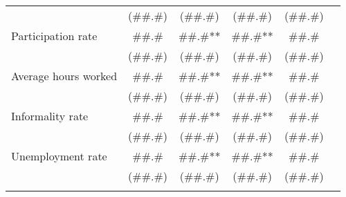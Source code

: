 \begin{tabular}{rccccc}
      & (\#\#.\#) & (\#\#.\#) & (\#\#.\#) & (\#\#.\#) &  \\
\multicolumn{1}{l}{Participation rate} & \#\#.\# & \#\#.\#** & \#\#.\#** & \#\#.\# &  \\
      & (\#\#.\#) & (\#\#.\#) & (\#\#.\#) & (\#\#.\#) &  \\
\multicolumn{1}{l}{Average hours worked} & \#\#.\# & \#\#.\#** & \#\#.\#** & \#\#.\# &  \\
      & (\#\#.\#) & (\#\#.\#) & (\#\#.\#) & (\#\#.\#) &  \\
\multicolumn{1}{l}{Informality rate} & \#\#.\# & \#\#.\#** & \#\#.\#** & \#\#.\# &  \\
      & (\#\#.\#) & (\#\#.\#) & (\#\#.\#) & (\#\#.\#) &  \\
\multicolumn{1}{l}{Unemployment rate} & \#\#.\# & \#\#.\#** & \#\#.\#** & \#\#.\# &  \\
      & (\#\#.\#) & (\#\#.\#) & (\#\#.\#) & (\#\#.\#) &  \\
      &       &       &       &       &  \\
\bottomrule
\end{tabular}%
